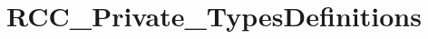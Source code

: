 \hypertarget{group___r_c_c___private___types_definitions}{\section{R\-C\-C\-\_\-\-Private\-\_\-\-Types\-Definitions}
\label{group___r_c_c___private___types_definitions}
}

